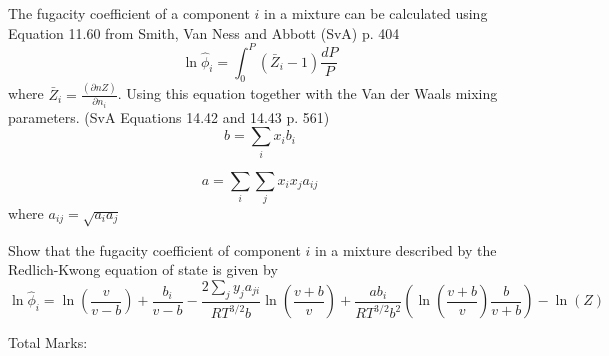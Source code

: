 \documentclass[12pt, A4paper]{article}
\newcounter{parameters}
\begin{document}
The fugacity coefficient of a component $i$ in a mixture can be calculated using Equation 11.60 from Smith, Van Ness and Abbott (SvA) p. 404
$$
\ln{\hat{\phi}_i} = \int^P_0 (\bar{Z}_i - 1) \frac{d P}{P}
$$
where $\bar{Z}_i  = \frac{\left( \partial n Z \right)}{\partial n_i}$. Using this equation together with the Van der Waals mixing parameters. (SvA Equations 14.42 and 14.43 p. 561)
$$
b = \sum_{i} x_i b_i
$$

$$
a = \sum_{i}\sum_{j} x_i x_j a_{ij}
$$
 where $a_{ij} = \sqrt{a_i a_j}$
 

  Show that the fugacity coefficient of component $i$ in a mixture described by the Redlich-Kwong equation of state is given by
 $$
\ln{\hat{\phi}_i} = \ln{\left(\frac{v}{v - b} \right)}  + \frac{b_i}{v - b} - \frac{2 \sum_{j} y_j a_{ji}}{R T^{3/2} b} \ln{\left( \frac{v + b}{v} \right)}  + \frac{a b_i}{RT^{3/2} b^2} \left( \ln \left( \frac{v + b}{v}\right) \frac{b}{v + b}  \right) - \ln(Z)
$$
 
\begin{centering}
Total Marks: \\
\end{centering}


%

\end{document}
